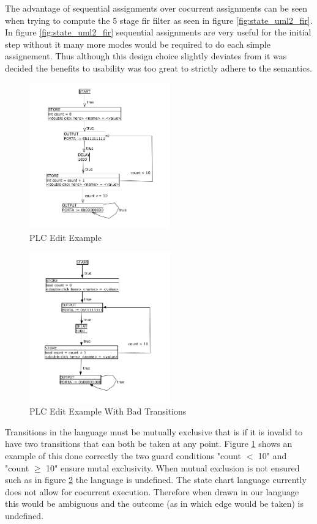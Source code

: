 The advantage of sequential assignments over cocurrent assignments can be seen when trying to compute the 5 stage fir filter as seen in figure \ref{fig:state_uml2_fir}. In figure \ref{fig:state_uml2_fir} sequential assignments are very useful for the initial step without it many more modes would be required to do each simple assignement. Thus although this design choice slightly deviates from \cite{UML2} it was decided the benefits to usability was too great to strictly adhere to the \cite{UML2} semantics.

\begin{figure}[htp]
    \centering
    \includegraphics[width=230px]{./images/tool_transition_example.png}
    \caption{PLC Edit Example}
    \label{fig:tool_transition_example}
\end{figure}

\begin{figure}[htp]
    \centering
    \includegraphics[width=230px]{./images/tool_transition_example_bad.png}
    \caption{PLC Edit Example With Bad Transitions}
    \label{fig:tool_transition_example_bad}
\end{figure}

Transitions in the language must be mutually exclusive that is if it is invalid to have two transitions that can both be taken at any point. Figure \ref{fig:tool_transition_example} shows an example of this done correctly the two guard conditions "count $<$ 10" and "count $\geq$ 10" ensure mutal exclusivity. When mutual exclusion is not ensured such as in figure \ref{fig:tool_transition_example_bad} the language is undefined. The state chart language currently does not allow for cocurrent execution. Therefore when drawn in our language this would be ambiguous and the outcome (as in which edge would be taken) is undefined.
